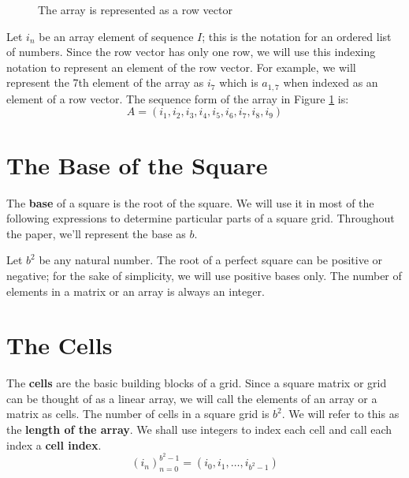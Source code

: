\documentclass[twoside,openany,12pt]{book}
\begin{document}
    \begin{figure}[h]
        \centering
        \caption{The array is represented as a row vector} \label{row_vector_form}
    \end{figure}

    Let $i_n$ be an array element of sequence $I$; this is the notation for an ordered list of numbers. Since the row vector has only one row, we will use this indexing notation to represent an element of the row vector. For example, we will represent the 7th element of the array as $i_7$ which is $a_{1,7}$ when indexed as an element of a row vector. The sequence form of the array in Figure \ref{row_vector_form} is:
    \begin{equation}
        A = (i_1,i_2,i_3,i_4,i_5,i_6,i_7,i_8,i_9)
    \end{equation}

    \section{The Base of the Square} \label{base}
    The \textbf{base} of a square is the root of the square. We will use it in most of the following expressions to determine particular parts of a square grid. Throughout the paper, we'll represent the base as $b$. 

    Let $b^2$ be any natural number. The root of a perfect square can be positive or negative; for the sake of simplicity, we will use positive bases only. The number of elements in a matrix or an array is always an integer.

    \section{The Cells} \label{cells}
    The \textbf{cells} are the basic building blocks of a grid. Since a square matrix or grid can be thought of as a linear array, we will call the elements of an array or a matrix as cells. The number of cells in a square grid is $b^2$. We will refer to this as the \textbf{length of the array}. We shall use integers to index each cell and call each index a \textbf{cell index}.
    \begin{equation}
      (i_n)_{n=0}^{b^2-1} = (i_0, i_1, \dots ,i_{b^2-1})
    \end{equation}
\end{document}
